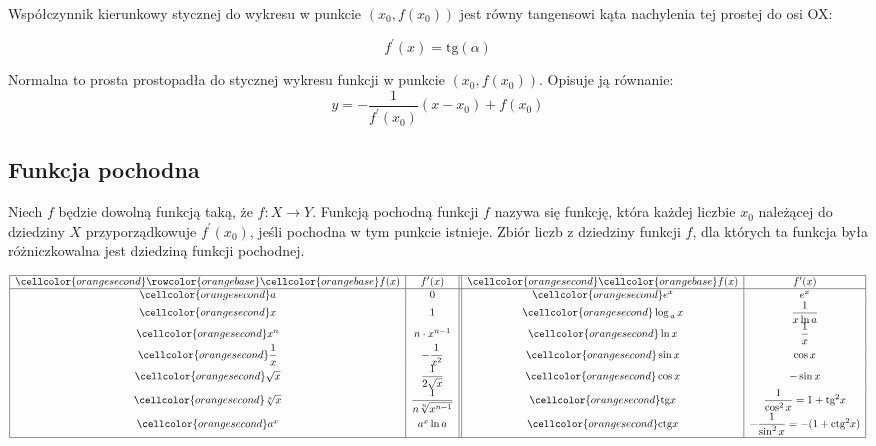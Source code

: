 \documentclass[14pt,a4paper]{extarticle}
\begin{document}
\noindent Współczynnik kierunkowy stycznej do wykresu w punkcie $(x_{0}, f(x_{0}))$ jest równy tangensowi kąta nachylenia tej prostej do osi OX:

$$f^{\prime}(x) = \text{tg}(\alpha)$$

\noindent Normalna to prosta prostopadła do stycznej wykresu funkcji w punkcie $(x_{0}, f(x_{0}))$. Opisuje ją
równanie:
$$y = -\frac{1}{f^{\prime}(x_{0})}(x - x_{0}) + f(x_{0})$$

\subsection{Funkcja pochodna}
Niech $f$ będzie dowolną funkcją taką, że $f:X \rightarrow Y$. Funkcją pochodną funkcji $f$
nazywa się funkcję, która każdej liczbie $x_{0}$ należącej do dziedziny $X$ przyporządkowuje $f^{\prime}(x_{0})$, jeśli
pochodna w tym punkcie istnieje. Zbiór liczb z dziedziny funkcji $f$, dla których ta funkcja była różniczkowalna
jest dziedziną funkcji pochodnej.














{%

\renewcommand{\arraystretch}{2}
\renewcommand{\arraycolsep}{0.5cm}

\begin{center}
\begin{equation*}
\begin{array}{|>{\cellcolor{orangesecond}}c|c||>{\cellcolor{orangesecond}}c|c|}
\hline
\rowcolor{orangebase}\cellcolor{orangebase}f(x) & f^{\prime}(x) &\cellcolor{orangebase}f(x) & f^{\prime}(x)\\
\hline
 a & 0 & e^{x} & e^{x} \\
 x & 1 & \log_{\,a}x & \dfrac{1}{x \ln a} \\
 x^{n} & n\cdot x^{n-1} & \ln x & \dfrac{1}{x} \\
 \dfrac{1}{x} & -\dfrac{1}{x^{2}} & \sin x & \cos x \\
 \sqrt{x} & \dfrac{1}{2\sqrt{x}} & \cos x & -\sin x\\
 \sqrt[n]{x} & \dfrac{1}{n\sqrt[n]{x^{n-1}}} & \text{tg} x & \dfrac{1}{\cos^{2}x} = 1 + \text{tg}^{2} x \\
 a^{x} & a^{x}\ln a & \text{ctg} x & -\dfrac{1}{\sin^{2}x} = -(1 + \text{ctg}^{2} x) \\[\medskipamount]
\hline
\end{array}
\end{equation*}
\end{center}
}%
\end{document}
